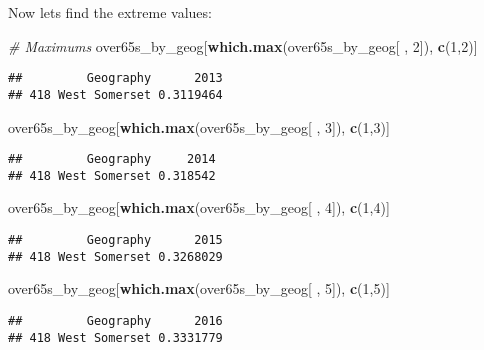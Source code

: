 \documentclass[]{article}
\newenvironment{Shaded}{\begin{snugshade}}{\end{snugshade}}
\newcommand{\KeywordTok}[1]{\textcolor[rgb]{0.13,0.29,0.53}{\textbf{#1}}}
\newcommand{\DecValTok}[1]{\textcolor[rgb]{0.00,0.00,0.81}{#1}}
\newcommand{\CommentTok}[1]{\textcolor[rgb]{0.56,0.35,0.01}{\textit{#1}}}
\newcommand{\NormalTok}[1]{#1}
\begin{document}
Now lets find the extreme values:

\begin{Shaded}
\begin{Highlighting}[]
\CommentTok{# Maximums}
\NormalTok{over65s_by_geog[}\KeywordTok{which.max}\NormalTok{(over65s_by_geog[ , }\DecValTok{2}\NormalTok{]), }\KeywordTok{c}\NormalTok{(}\DecValTok{1}\NormalTok{,}\DecValTok{2}\NormalTok{)]}
\end{Highlighting}
\end{Shaded}

\begin{verbatim}
##         Geography      2013
## 418 West Somerset 0.3119464
\end{verbatim}

\begin{Shaded}
\begin{Highlighting}[]
\NormalTok{over65s_by_geog[}\KeywordTok{which.max}\NormalTok{(over65s_by_geog[ , }\DecValTok{3}\NormalTok{]), }\KeywordTok{c}\NormalTok{(}\DecValTok{1}\NormalTok{,}\DecValTok{3}\NormalTok{)]}
\end{Highlighting}
\end{Shaded}

\begin{verbatim}
##         Geography     2014
## 418 West Somerset 0.318542
\end{verbatim}

\begin{Shaded}
\begin{Highlighting}[]
\NormalTok{over65s_by_geog[}\KeywordTok{which.max}\NormalTok{(over65s_by_geog[ , }\DecValTok{4}\NormalTok{]), }\KeywordTok{c}\NormalTok{(}\DecValTok{1}\NormalTok{,}\DecValTok{4}\NormalTok{)]}
\end{Highlighting}
\end{Shaded}

\begin{verbatim}
##         Geography      2015
## 418 West Somerset 0.3268029
\end{verbatim}

\begin{Shaded}
\begin{Highlighting}[]
\NormalTok{over65s_by_geog[}\KeywordTok{which.max}\NormalTok{(over65s_by_geog[ , }\DecValTok{5}\NormalTok{]), }\KeywordTok{c}\NormalTok{(}\DecValTok{1}\NormalTok{,}\DecValTok{5}\NormalTok{)]}
\end{Highlighting}
\end{Shaded}

\begin{verbatim}
##         Geography      2016
## 418 West Somerset 0.3331779
\end{verbatim}
\end{document}
